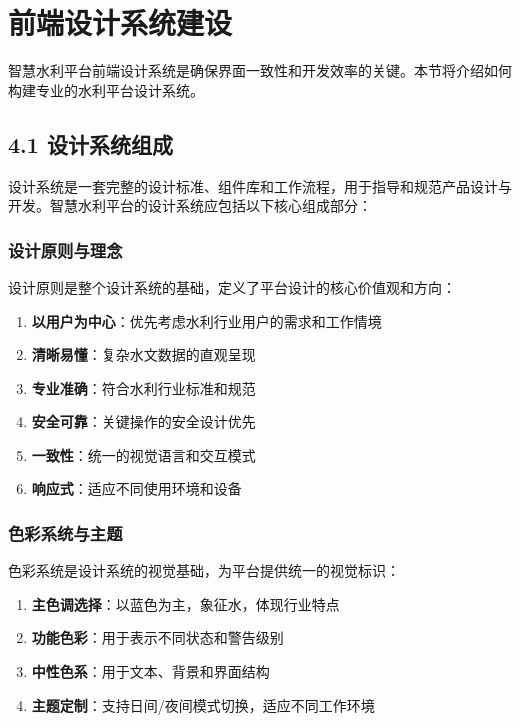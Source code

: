\section{前端设计系统建设}\label{ux524dux7aefux8bbeux8ba1ux7cfbux7edfux5efaux8bbe}

智慧水利平台前端设计系统是确保界面一致性和开发效率的关键。本节将介绍如何构建专业的水利平台设计系统。

\subsection{4.1
设计系统组成}\label{ux8bbeux8ba1ux7cfbux7edfux7ec4ux6210}

设计系统是一套完整的设计标准、组件库和工作流程，用于指导和规范产品设计与开发。智慧水利平台的设计系统应包括以下核心组成部分：

\subsubsection{设计原则与理念}\label{ux8bbeux8ba1ux539fux5219ux4e0eux7406ux5ff5}

设计原则是整个设计系统的基础，定义了平台设计的核心价值观和方向：

\begin{enumerate}
\def\labelenumi{\arabic{enumi}.}
\tightlist
\item
  \textbf{以用户为中心}：优先考虑水利行业用户的需求和工作情境
\item
  \textbf{清晰易懂}：复杂水文数据的直观呈现
\item
  \textbf{专业准确}：符合水利行业标准和规范
\item
  \textbf{安全可靠}：关键操作的安全设计优先
\item
  \textbf{一致性}：统一的视觉语言和交互模式
\item
  \textbf{响应式}：适应不同使用环境和设备
\end{enumerate}

\subsubsection{色彩系统与主题}\label{ux8272ux5f69ux7cfbux7edfux4e0eux4e3bux9898}

色彩系统是设计系统的视觉基础，为平台提供统一的视觉标识：

\begin{enumerate}
\def\labelenumi{\arabic{enumi}.}
\tightlist
\item
  \textbf{主色调选择}：以蓝色为主，象征水，体现行业特点
\item
  \textbf{功能色彩}：用于表示不同状态和警告级别
\item
  \textbf{中性色系}：用于文本、背景和界面结构
\item
  \textbf{主题定制}：支持日间/夜间模式切换，适应不同工作环境
\end{enumerate}

